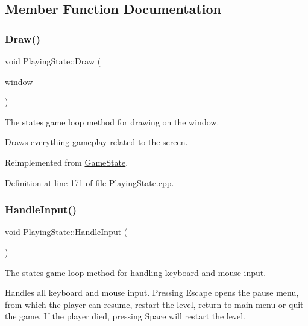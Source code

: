 \subsection{Member Function Documentation}
\mbox{\label{class_playing_state_a6f5feffc1c6de994450828fbe2f5c173}} 
\subsubsection{\texorpdfstring{Draw()}{Draw()}}
{\footnotesize\ttfamily void Playing\+State\+::\+Draw (\begin{DoxyParamCaption}\item[{sf\+::\+Render\+Window \&}]{window }\end{DoxyParamCaption})\hspace{0.3cm}{\ttfamily [virtual]}}



The state\textquotesingle{}s game loop method for drawing on the window. 

Draws everything gameplay related to the screen. 

Reimplemented from \hyperlink{class_game_state_a8741c5c696c6c366beb4b845c08c3cf8}{Game\+State}.



Definition at line 171 of file Playing\+State.\+cpp.

\mbox{\label{class_playing_state_ab61fc6f59f00ccf5db80f67d5e4c50a1}} 
\subsubsection{\texorpdfstring{Handle\+Input()}{HandleInput()}}
{\footnotesize\ttfamily void Playing\+State\+::\+Handle\+Input (\begin{DoxyParamCaption}{ }\end{DoxyParamCaption})\hspace{0.3cm}{\ttfamily [virtual]}}



The state\textquotesingle{}s game loop method for handling keyboard and mouse input. 

Handles all keyboard and mouse input. Pressing Escape opens the pause menu, from which the player can resume, restart the level, return to main menu or quit the game. If the player died, pressing Space will restart the level. 

